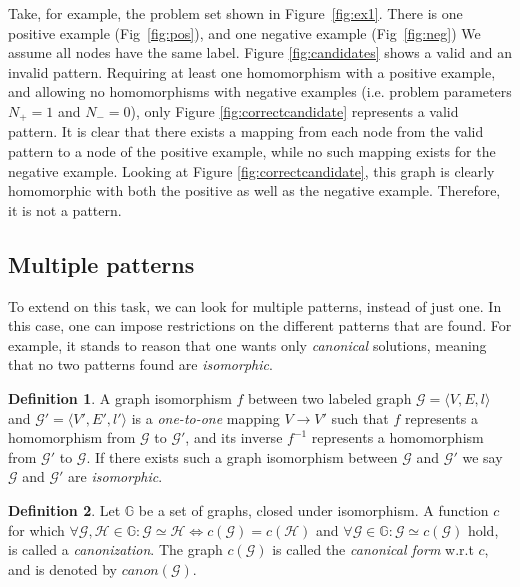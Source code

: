 \documentclass{article}
\theoremstyle{definition}
\newtheorem{definition}{Definition}[section]
\newcommand{\triple}[1]{\ensuremath{\langle #1 \rangle}}
\newcommand{\graph}[1]{\ensuremath{\mathcal{#1}}}
\newcommand{\graphset}[1]{\ensuremath{\mathbb{#1}}}
\begin{document}
Take, for example, the problem set shown in Figure~\ref{fig:ex1}.
There is one positive example (Fig~\ref{fig:pos}), and one negative example (Fig~\ref{fig:neg})
We assume all nodes have the same label.
Figure \ref{fig:candidates} shows a valid and an invalid pattern.
Requiring at least one homomorphism with a positive example, and allowing no homomorphisms with negative examples (i.e. problem parameters $N_{+}=1$ and $N_{-}=0$), only Figure \ref{fig:correctcandidate} represents a valid pattern.
It is clear that there exists a mapping from each node from the valid pattern to a node of the positive example, while no such mapping exists for the negative example.
Looking at Figure \ref{fig:correctcandidate}, this graph is clearly homomorphic with both the positive as well as the negative example. Therefore, it is not a pattern.

\subsection{Multiple patterns}
To extend on this task, we can look for multiple patterns, instead of just one.
In this case, one can impose restrictions on the different patterns that are found.
For example, it stands to reason that one wants only \emph{canonical} solutions, meaning that no two patterns found are \emph{isomorphic}.

\begin{definition}
\label{def:isomorphism}
A graph isomorphism $f$ between two labeled graph $\graph{G} = \triple{V,E,l}$ and $\graph{G'} = \triple{V',E',l'}$ is a \emph{one-to-one} mapping $V \rightarrow V'$ 
such that $f$ represents a homomorphism from $\graph{G}$ to $\graph{G'}$,
and its inverse $f^{-1}$ represents a homomorphism from $\graph{G'}$ to $\graph{G}$.
If there exists such a graph isomorphism between $\graph{G}$ and $\graph{G'}$ we say $\graph{G}$ and $\graph{G'}$ are \emph{isomorphic}.
\end{definition}


\begin{definition}
  \label{def:canonicalForm}
  Let $\graphset{G}$ be a set of graphs, closed under isomorphism.
  A function $c$ for which $\forall \graph{G,H} \in \graphset{G} : \graph{G} \simeq \graph{H} \iff c(\graph{G}) = c(\graph{H})$ and $\forall \graph{G} \in \graphset{G} : \graph{G} \simeq c(\graph{G})$ hold, is called a \emph{canonization}.
  The graph $c(\graph{G})$ is called the \emph{canonical form} w.r.t $c$, and is denoted by $\mathit{canon}(\graph{G})$.
\end{definition}
\end{document}
